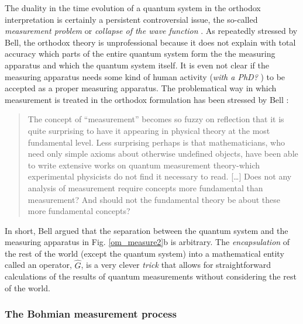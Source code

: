\documentclass[onecolumn,nofootinbib, secnumarabic, amsmath, nobibnotes,11pt,aps,pra]{revtex4-1}
\newcommand{\fref}[1]{Fig. \ref{#1}}
\begin{document}
The duality in the time evolution of a quantum system in the orthodox interpretation is certainly a persistent controversial issue, the so-called \textit{measurement problem} or \textit{collapse of the wave function} \cite{om.bell1990,om.extra15}. As repeatedly stressed by Bell, the orthodox theory is unprofessional because it does not explain with total accuracy which parts of the entire quantum system form the the measuring apparatus and which the quantum system itself. It is even not clear if the measuring apparatus needs some kind of human activity (\textit{with a PhD?} \cite{om.bell1990}) to be accepted as a proper measuring apparatus. The problematical way in which measurement is treated in the orthodox formulation has been stressed by Bell \cite{om.Bell1987}:
\begin{quote}
The concept of ``measurement'' becomes so fuzzy on reflection that it is quite surprising to have it appearing in physical theory at the most fundamental level. Less surprising perhaps is that mathematicians, who need only simple axioms about otherwise undefined objects, have been able to write extensive works on quantum measurement theory-which experimental physicists do not find it necessary to read. [\ldots] Does not any analysis of measurement require concepts more fundamental than measurement? And should not the fundamental theory be about these more fundamental concepts?
\end{quote}
In short, Bell argued that the separation between the quantum
system and the measuring apparatus in \fref{om_measure2}b is
arbitrary. The \textit{encapsulation} of the rest of the world (except
the quantum system) into a mathematical entity called an operator,
$\hat{G}$\!, is a very clever \textit{trick} that allows for
straightforward calculations of the results of quantum measurements
\cite{om.Durrnaive,om.goldstein} without considering the rest of
the  world.

\subsubsection{The Bohmian measurement process}
\end{document}
